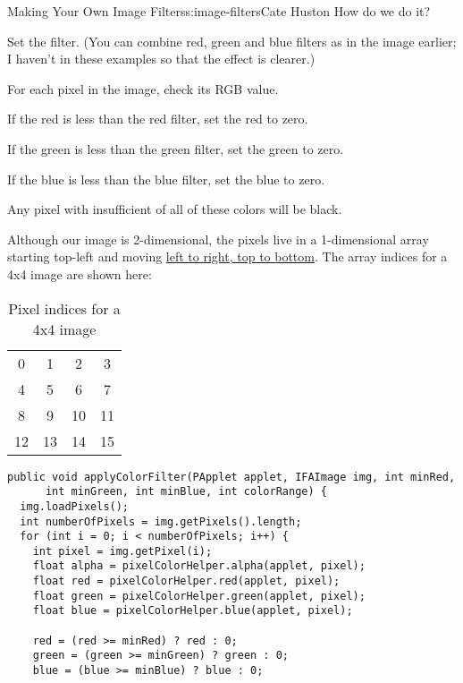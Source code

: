 \begin{aosachapter}{Making Your Own Image Filters}{s:image-filters}{Cate Huston}
How do we do it?

\begin{aosaitemize}
\item
  Set the filter. (You can combine red, green and blue filters as in the
  image earlier; I haven't in these examples so that the effect is
  clearer.)
\item
  For each pixel in the image, check its RGB value.
\item
  If the red is less than the red filter, set the red to zero.
\item
  If the green is less than the green filter, set the green to zero.
\item
  If the blue is less than the blue filter, set the blue to zero.
\item
  Any pixel with insufficient of all of these colors will be black.
\end{aosaitemize}

Although our image is 2-dimensional, the pixels live in a 1-dimensional
array starting top-left and moving
\href{https://processing.org/tutorials/pixels/}{left to right, top to
bottom}. The array indices for a 4x4 image are shown here:

\begin{table}
\centering
{\footnotesize
{}
\begin{tabular}{cccc}
\hline
0 & 1 & 2 & 3 \\
4 & 5 & 6 & 7 \\
8 & 9 & 10 & 11 \\
12 & 13 & 14 & 15 \\
\hline
\end{tabular}
}
\caption{Pixel indices for a 4x4 image}
\label{500l.imagefilters.pixelindices}
\end{table}

\begin{verbatim}
public void applyColorFilter(PApplet applet, IFAImage img, int minRed,
      int minGreen, int minBlue, int colorRange) {  
  img.loadPixels();
  int numberOfPixels = img.getPixels().length;
  for (int i = 0; i < numberOfPixels; i++) {
    int pixel = img.getPixel(i);
    float alpha = pixelColorHelper.alpha(applet, pixel);
    float red = pixelColorHelper.red(applet, pixel);
    float green = pixelColorHelper.green(applet, pixel);
    float blue = pixelColorHelper.blue(applet, pixel);
      
    red = (red >= minRed) ? red : 0;
    green = (green >= minGreen) ? green : 0;
    blue = (blue >= minBlue) ? blue : 0;
    

\end{verbatim}
\end{aosachapter}
